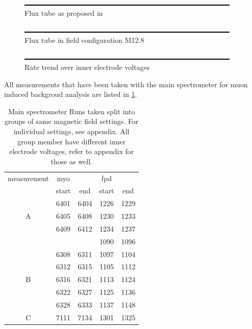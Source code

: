     
  \begin{figure}
	\includegraphics[width = 0.9 \textwidth]{graphics/dummy.eps}
	\caption[Flux tube P12.M8]{Flux tube as proposed in \cite{proposalM12}}
  	\label{fig:newFluxTube}
  \end{figure}
  
  \begin{figure}
	\caption[Flux tube M12.8]{Flux tube in field configuration M12.8}
  	\includegraphics[width = 0.9 \textwidth]{graphics/dummy.eps}
  \end{figure}
  
  \begin{figure}
  	\caption[Inner electrode field emission]{Rate trend over inner electrode voltages}
  	\includegraphics[width = 0.9 \textwidth]{graphics/dummy.eps}
  \end{figure}

  
All measurements that have been taken with the main spectrometer for muon induced backgroud analysis are listed in \ref{tab:mainSPecSettings}.

\begin{table}
	\centering
	\begin{tabular}{|c|cc|cc|}
		\hline
		measurement & myo & & fpd & \\
		& start & end & start & end\\
		\hline
		& 6401 & 6404 & 1226 & 1229\\
		A& 6405 & 6408 & 1230 & 1233\\
		& 6409 & 6412 & 1234 & 1237\\
		\hline
		
		& & & 1090 & 1096\\
		& 6308 & 6311 & 1097 & 1104\\
		& 6312 & 6315 & 1105 & 1112\\
		B& 6316 & 6321 & 1113 & 1124\\
		& 6322 & 6327 & 1125 & 1136\\
		& 6328 & 6333 & 1137 & 1148\\
		\hline
		
		C& 7111 & 7134 & 1301 & 1325\\
		\hline

	\end{tabular}
	\caption[Main spectrometer runs]{Main spectrometer Runs taken split into groups of same magnetic field settings. For individual settings, see appendix. All group member have different inner electrode voltages, refer to appendix for those as well.}
	\label{tab:mainSPecSettings}
\end{table}
  
  
